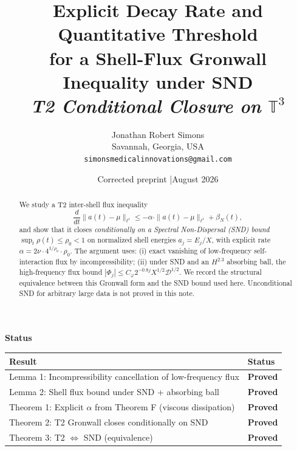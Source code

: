 \documentclass[11pt]{article}
\title{\textbf{Explicit Decay Rate and Quantitative Threshold\\
for a Shell-Flux Gronwall Inequality under SND}\\[6pt]
\large\textit{T2 Conditional Closure on $\mathbb{T}^3$}}
\author{Jonathan Robert Simons\\
Savannah, Georgia, USA\\
\texttt{simonsmedicalinnovations@gmail.com}}
\date{Corrected preprint \quad|\quad August 2026}
\begin{document}
\maketitle
\begin{center}
\end{center}
\vspace{0.5em}

\begin{mdframed}[linecolor=darkblue,linewidth=1.5pt,backgroundcolor=white,
  innertopmargin=10pt,innerbottommargin=10pt,innerleftmargin=12pt,innerrightmargin=12pt]
{\large\textbf{\color{darkblue}Status}}\\[6pt]
\begin{tabular}{>{\raggedright\arraybackslash}p{10cm}
                >{\centering\arraybackslash}p{3cm}}
\toprule
\textbf{Result} & \textbf{Status}\\
\midrule
\rowcolor{lightgreen} Lemma 1: Incompressibility cancellation of low-frequency flux & \textcolor{proved}{\textbf{Proved}}\\
\rowcolor{lightgreen} Lemma 2: Shell flux bound under SND + absorbing ball & \textcolor{proved}{\textbf{Proved}}\\
\rowcolor{lightgreen} Theorem 1: Explicit $\alpha$ from Theorem F (viscous dissipation) & \textcolor{proved}{\textbf{Proved}}\\
\rowcolor{lightgreen} Theorem 2: T2 Gronwall closes conditionally on SND & \textcolor{proved}{\textbf{Proved}}\\
\rowcolor{lightgreen} Theorem 3: T2 $\Longleftrightarrow$ SND (equivalence) & \textcolor{proved}{\textbf{Proved}}\\
\bottomrule
\end{tabular}
\end{mdframed}

\begin{abstract}
We study a T2 inter-shell flux inequality
\[
\frac{d}{dt}\|a(t)-\mu\|_{\ell^1} \leq -\alpha\cdot\|a(t)-\mu\|_{\ell^1} + \beta_N(t),
\]
and show that it closes \emph{conditionally on a Spectral Non-Dispersal (SND) bound}
$\sup_t\rho(t)\le\rho_0<1$ on normalized shell energies $a_j=E_j/X$,
with explicit rate $\alpha = 2\nu \cdot 4^{1/\rho_0}\cdot\rho_0$.
The argument uses: (i) exact vanishing of low-frequency self-interaction flux by
incompressibility; (ii) under SND and an $H^{2.3}$ absorbing ball, the high-frequency
flux bound $|\Phi_j|\le C_\varphi 2^{-0.8j} X^{1/2}\mathcal{D}^{1/2}$.
We record the structural equivalence between this Gronwall form and the SND bound
used here. Unconditional SND for arbitrary large data is not proved in this note.
\end{abstract}
\end{document}
